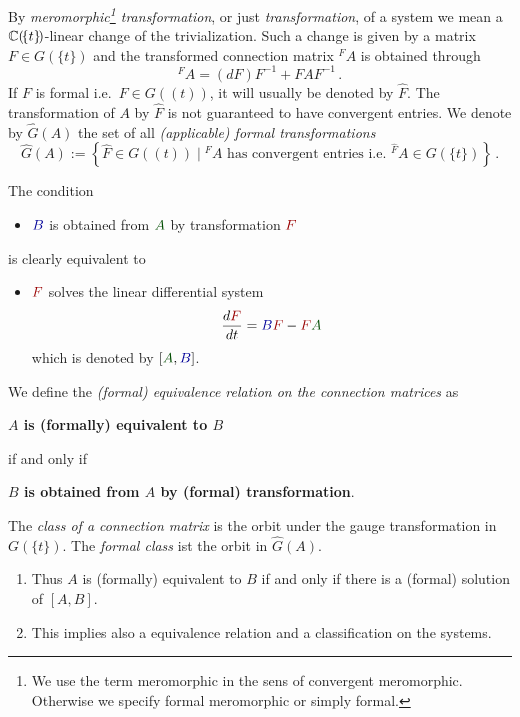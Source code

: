 By \emph{meromorphic\footnote{We use the term meromorphic in the sens of
convergent meromorphic. Otherwise we specify formal meromorphic or simply
formal.} transformation}, or just \emph{transformation}, of a system we mean a
$\mathbb{C}(\!\{t\}\!)$-linear change of the trivialization.  Such a change is given by
a matrix $F\in G(\!\{t\}\!)$ and the transformed connection matrix ${}^F\!A$ is
obtained through
\[
  {}^F\!A=(dF)F^{-1} + FAF^{-1} \,.
\]
If $F$ is formal i.e.\ $F\in G(\!(t)\!)$, it will usually be denoted by
$\hat F$.
The transformation of $A$ by $\hat F$ is not guaranteed to have convergent
entries.
We denote by $\hat G(A)$ the set of all \emph{(applicable) formal
transformations}
\[
  \hat G(A):=\left\{\hat F\in G(\!(t)\!)
    \mid {}^{\hat F}\!A \text{ has convergent entries i.e.\ }
    {}^{\hat F}\!A\in G(\!\{t\}\!)
  \right\}\,.
\]
\begin{rem}
  \def\myB{\textcolor{blue!60!black}{B}}
  \def\myA{\textcolor{green!30!black}{A}}
  \def\myF{\textcolor{red!60!black}{F}}
  The condition
  \begin{itemize}
    \item[] $\myB$ is obtained from $\myA$ by transformation $\myF$
  \end{itemize}
  is clearly equivalent to
  \begin{itemize}
    \item[]  $\myF$ solves the linear differential system
      \[
        \frac{d\myF}{dt}=\myB\myF-\myF\myA
      \]
      which is denoted by $[\myA,\myB]$.
  \end{itemize}
  \begin{comment}
    \begin{s-rem}
      $[A]=[0,A]$ \TODO[korrekt?]
    \end{s-rem}
  \end{comment}
\end{rem}
\begin{defn}
  We define the \emph{(formal) equivalence relation on the connection matrices}
  as
  \begin{einr}
    \textbf{\boldmath$A$ is (formally) equivalent to $B$}
  \end{einr}
  if and only if
  \begin{einr}
    \textbf{\boldmath$B$ is obtained from $A$ by (formal) transformation}.
  \end{einr}
  The \emph{class of a connection matrix} is the orbit under the gauge
  transformation in $G(\!\{t\}\!)$. The \emph{formal class} ist the orbit in
  $\hat G(A)$.
  \begin{s-rem}
    \begin{enumerate}
      \item Thus $A$ is (formally) equivalent to $B$ if and only if there is a
        (formal) solution of $[A,B]$.
      \item This implies also a equivalence relation and a classification on
        the systems.
    \end{enumerate}
  \end{s-rem}
\end{defn}

